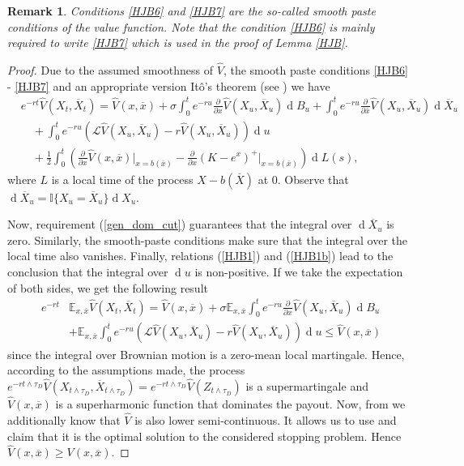 \documentclass[10pt,a4paper]{amsart}
\def\E{{\mathbb{E}}}
\def \R{{{\rm I{\!}\rm R}}}
\def \I{{\mathbb{I}}}
\newcommand{\dx}{\operatorname{d}\!}
\def\E{{\mathbb E}} \def\PP{\mc P} \def\Z{{\mathbb Z}} \def\R{{\mathbb R}}
\newtheorem{Rem}{Remark} \newtheorem{Exc}{Exercise}
\begin{document}
	\begin{Rem}
		\rm Conditions \eqref{HJB6} and \eqref{HJB7} are the so-called smooth paste conditions of the value function. Note that the condition \eqref{HJB6} is mainly required
		to write \eqref{HJB7} which is used in the proof of Lemma \ref{HJB}.
	\end{Rem}
	\begin{proof}
		Due to the assumed smoothness of $\hat{V}$, the smooth paste conditions \eqref{HJB6} - \eqref{HJB7} and an appropriate version It\^{o}'s theorem
		(see \cite[p. 208]{EisenbaumKyprianou}) we have
		\begin{align*}
			&e^{-rt}\hat{V}(X_t, \overline{X}_t) =
			\hat{V}(x,\overline{x}) + \sigma\int_0^t e^{-r u} \frac{\partial}{\partial x} \hat{V}(X_u, \overline{X}_u) \dx B_u + \int_0^t e^{-r u} \frac{\partial}{\partial \overline{x}} \hat{V}(X_u, \overline{X}_u) \dx \overline{X}_u \nonumber\\
			&\quad + \int_0^t e^{-r u} \left( \mathcal{L}\hat{V}(X_u, \overline{X}_u) - r\hat{V}(X_u, \overline{X}_u) \right) \dx u\\&\quad  +\frac{1}{2}
			\int_0^t \left( \frac{\partial}{\partial x} \hat{V}(x, \overline{x}) \big|_{x = b(\overline{x})} - \frac{\partial}{\partial x} (K - e^x)^+ \big|_{x = b(\overline{x})}\right)\dx L(s), \nonumber
		\end{align*}
		where $L$ is a local time of the process $X - b(\overline{X})$ at 0. Observe that $\dx \overline{X}_u = \I\{ X_u = \overline{X}_u \}\dx X_u$.
		
		Now, requirement (\ref{gen_dom_cut}) guarantees that the integral over $\dx \overline{X}_u$ is zero. Similarly, the smooth-paste conditions make sure that the integral over the local time also vanishes. Finally, relations (\ref{HJB1}) and (\ref{HJB1b}) lead to the conclusion that the integral over $\dx u$ is non-positive. If we take the expectation of both sides, we get the following result
		\begin{align*}
			e^{-rt}&\E_{x,\overline{x}}\hat{V}(X_t, \overline{X}_t) = \hat{V}(x,\overline{x}) + \sigma \E_{x,\overline{x}} \int_0^t e^{-r u} \frac{\partial}{\partial x} \hat{V}(X_u, \overline{X}_u) \dx B_u \\
			&+  \E_{x,\overline{x}} \int_0^t e^{-r u} \left( \mathcal{L}\hat{V}(X_u, \overline{X}_u) - r\hat{V}(X_u, \overline{X}_u) \right) \dx u \leq \hat{V}(x,\overline{x})
		\end{align*}
		since the integral over Brownian motion is a zero-mean local martingale. Hence, according to the assumptions made, the process $e^{-rt\wedge \tau_D}\hat{V}(X_{t\wedge \tau_D}, \overline{X}_{t\wedge \tau_D})=e^{-rt\wedge \tau_D}\hat{V}(Z_{t\wedge \tau_D})$ is a supermartingale and $\hat{V}(x,\overline{x})$ is a superharmonic function that dominates the payout. Now, from \cite[(2.2.80), p. 49]{PS} we additionally know that $\hat{V}$ is also lower semi-continuous. It allows us to use \cite[Thm. 2.7, p. 40]{PS} and claim that it is the optimal solution to the considered stopping problem. Hence $\hat{V}(x, \overline{x})\geq V(x, \overline{x})$.
	\end{proof}
\end{document}
